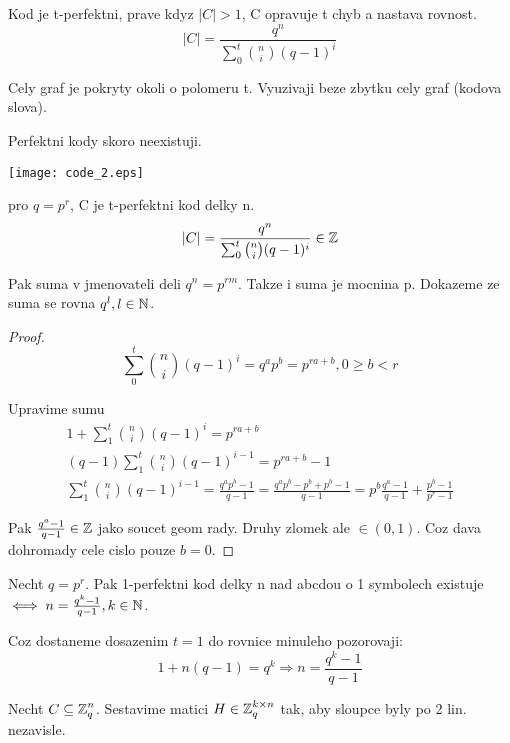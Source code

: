 \begin{definition}
	Kod je t-perfektni, prave kdyz $|C| > 1$, C opravuje t chyb a nastava rovnost.
	\[ |C| = \frac{q^n}{\sum_0^t \binom{n}{i} (q - 1)^i} \]

	Cely graf je pokryty okoli o polomeru t. Vyuzivaji beze zbytku cely graf (kodova slova).
\end{definition}

\begin{note}
	Perfektni kody skoro neexistuji.

	\texttt{[image: code\_2.eps]}
\end{note}

\begin{observation}
	pro $q = p^r$, C je t-perfektni kod delky n.
	\[ |C| = \frac{q^n}{\sum_0^t \binom{n}{i} (q - 1)^i} \in \operatorname{\mathbb{Z}} \]

	Pak suma v jmenovateli deli $q^n = p^{rm}$. Takze i suma je mocnina p. Dokazeme ze suma se rovna $q^l, l \in \operatorname{\mathbb{N}}$.

\end{observation}

\begin{proof}
	\[ \sum_0^t \binom{n}{i} (q - 1)^i = q^a p^b = p^{ra + b}, 0 \geq b < r \]

	Upravime sumu
	\begin{gather*}
	1 + \sum_1^t \binom{n}{i} (q - 1)^i = p^{ra + b}\\
	(q - 1)\sum_1^t \binom{n}{i} (q - 1)^{i - 1} = p^{ra + b} - 1\\
	\sum_1^t \binom{n}{i} (q - 1)^{i - 1} = \frac{q^ap^b - 1}{q - 1} = \frac{q^ap^b - p^b + p^b - 1}{q - 1} = p^b \frac{q^a - 1}{q - 1} + \frac{p^b - 1}{p^r - 1}
	\end{gather*}

	Pak $\frac{q^a - 1}{q - 1} \in \operatorname{\mathbb{Z}}$ jako soucet geom rady. Druhy zlomek ale $\in (0, 1)$. Coz dava dohromady cele cislo pouze $b = 0$.
\end{proof}

\begin{theorem}
	Necht $q = p^r$. Pak 1-perfektni kod delky n nad abcdou o 1 symbolech existuje $\iff n = \frac{q^k - 1}{q - 1}, k \in \operatorname{\mathbb{N}}$.

	Coz dostaneme dosazenim $t = 1$ do rovnice minuleho pozorovaji:
	\[ 1 + n(q - 1) = q^k \Rightarrow n = \frac{q^k - 1}{q - 1} \]
\end{theorem}
	Necht $C \subseteq \operatorname{\mathbb{Z}}_q^n$. Sestavime matici $H \in \operatorname{\mathbb{Z}}_q^{k \times n}$ tak, aby sloupce byly po 2 lin. nezavisle.


